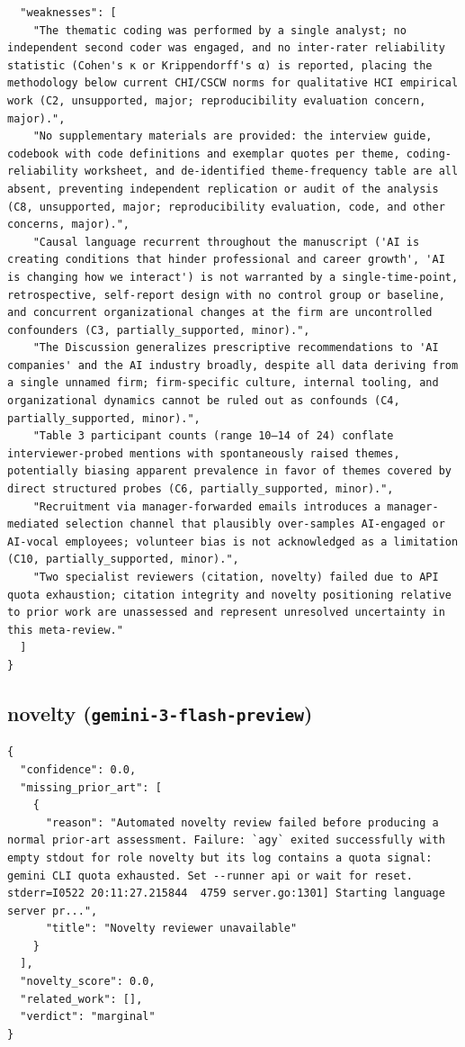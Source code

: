 \documentclass[11pt]{article}
\begin{document}
\begin{verbatim}
  "weaknesses": [
    "The thematic coding was performed by a single analyst; no independent second coder was engaged, and no inter-rater reliability statistic (Cohen's κ or Krippendorff's α) is reported, placing the methodology below current CHI/CSCW norms for qualitative HCI empirical work (C2, unsupported, major; reproducibility evaluation concern, major).",
    "No supplementary materials are provided: the interview guide, codebook with code definitions and exemplar quotes per theme, coding-reliability worksheet, and de-identified theme-frequency table are all absent, preventing independent replication or audit of the analysis (C8, unsupported, major; reproducibility evaluation, code, and other concerns, major).",
    "Causal language recurrent throughout the manuscript ('AI is creating conditions that hinder professional and career growth', 'AI is changing how we interact') is not warranted by a single-time-point, retrospective, self-report design with no control group or baseline, and concurrent organizational changes at the firm are uncontrolled confounders (C3, partially_supported, minor).",
    "The Discussion generalizes prescriptive recommendations to 'AI companies' and the AI industry broadly, despite all data deriving from a single unnamed firm; firm-specific culture, internal tooling, and organizational dynamics cannot be ruled out as confounds (C4, partially_supported, minor).",
    "Table 3 participant counts (range 10–14 of 24) conflate interviewer-probed mentions with spontaneously raised themes, potentially biasing apparent prevalence in favor of themes covered by direct structured probes (C6, partially_supported, minor).",
    "Recruitment via manager-forwarded emails introduces a manager-mediated selection channel that plausibly over-samples AI-engaged or AI-vocal employees; volunteer bias is not acknowledged as a limitation (C10, partially_supported, minor).",
    "Two specialist reviewers (citation, novelty) failed due to API quota exhaustion; citation integrity and novelty positioning relative to prior work are unassessed and represent unresolved uncertainty in this meta-review."
  ]
}
\end{verbatim}

\subsection*{novelty (\texttt{gemini-3-flash-preview})}
\begin{verbatim}
{
  "confidence": 0.0,
  "missing_prior_art": [
    {
      "reason": "Automated novelty review failed before producing a normal prior-art assessment. Failure: `agy` exited successfully with empty stdout for role novelty but its log contains a quota signal: gemini CLI quota exhausted. Set --runner api or wait for reset. stderr=I0522 20:11:27.215844  4759 server.go:1301] Starting language server pr...",
      "title": "Novelty reviewer unavailable"
    }
  ],
  "novelty_score": 0.0,
  "related_work": [],
  "verdict": "marginal"
}
\end{verbatim}
\end{document}
